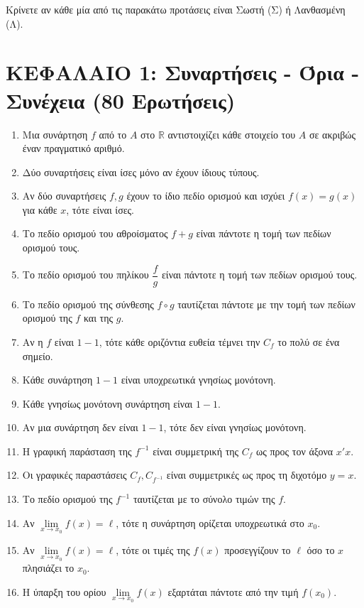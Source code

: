 \documentclass[11pt,a4paper]{article}
\newcommand{\kerkissans}[1]{{\fontfamily{maksf}\selectfont \textbf{#1}}}
\begin{document}
\noindent \kerkissans{\textbf{ΟΔΗΓΙΕΣ:}} Κρίνετε αν κάθε μία από τις παρακάτω προτάσεις είναι Σωστή (Σ) ή Λανθασμένη (Λ).

\section*{ΚΕΦΑΛΑΙΟ 1: Συναρτήσεις - Όρια - Συνέχεια (80 Ερωτήσεις)}
\begin{enumerate}[label=\textbf{1.\arabic*.}]
    \item Μια συνάρτηση $f$ από το $A$ στο $\mathbb{R}$ αντιστοιχίζει κάθε στοιχείο του $A$ σε ακριβώς έναν πραγματικό αριθμό.
    \item Δύο συναρτήσεις είναι ίσες μόνο αν έχουν ίδιους τύπους.
    \item Αν δύο συναρτήσεις $f, g$ έχουν το ίδιο πεδίο ορισμού και ισχύει $f(x)=g(x)$ για κάθε $x$, τότε είναι ίσες.
    \item Το πεδίο ορισμού του αθροίσματος $f+g$ είναι πάντοτε η τομή των πεδίων ορισμού τους.
    \item Το πεδίο ορισμού του πηλίκου $\dfrac{f}{g}$ είναι πάντοτε η τομή των πεδίων ορισμού τους.
    \item Το πεδίο ορισμού της σύνθεσης $f \circ g$ ταυτίζεται πάντοτε με την τομή των πεδίων ορισμού της $f$ και της $g$.
    \item Αν η $f$ είναι $1-1$, τότε κάθε οριζόντια ευθεία τέμνει την $C_f$ το πολύ σε ένα σημείο.
    \item Κάθε συνάρτηση $1-1$ είναι υποχρεωτικά γνησίως μονότονη.
    \item Κάθε γνησίως μονότονη συνάρτηση είναι $1-1$.
    \item Αν μια συνάρτηση δεν είναι $1-1$, τότε δεν είναι γνησίως μονότονη.
    \item Η γραφική παράσταση της $f^{-1}$ είναι συμμετρική της $C_f$ ως προς τον άξονα $x'x$.
    \item Οι γραφικές παραστάσεις $C_f, C_{f^{-1}}$ είναι συμμετρικές ως προς τη διχοτόμο $y=x$.
    \item Το πεδίο ορισμού της $f^{-1}$ ταυτίζεται με το σύνολο τιμών της $f$.
    \item Αν $\lim\limits_{x\to x_0} f(x) = \ell$, τότε η συνάρτηση ορίζεται υποχρεωτικά στο $x_0$.
    \item Αν $\lim\limits_{x\to x_0} f(x) = \ell$, τότε οι τιμές της $f(x)$ προσεγγίζουν το $\ell$ όσο το $x$ πλησιάζει το $x_0$.
    \item Η ύπαρξη του ορίου $\lim\limits_{x\to x_0} f(x)$ εξαρτάται πάντοτε από την τιμή $f(x_0)$.

\end{enumerate}
\end{document}

